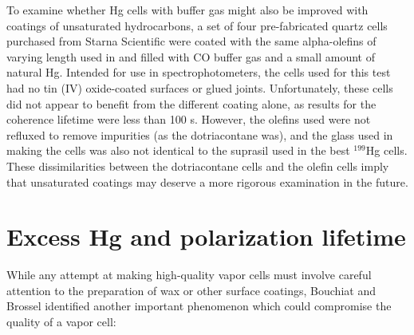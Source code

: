 \documentclass [10pt, twoside] {uwthesis}[2012/04/02]
\begin{document}
To examine whether Hg cells with buffer gas might also be improved with coatings of unsaturated hydrocarbons, a set of four pre-fabricated quartz cells purchased from Starna Scientific were coated with the same alpha-olefins of varying length used in \cite{2010_Budker_long_Rb_coherence_alpha_olefins} and filled with CO buffer gas and a small amount of natural Hg. Intended for use in spectrophotometers, the cells used for this test had no tin (IV) oxide-coated surfaces or glued joints. Unfortunately, these cells did not appear to benefit from the different coating alone, as results for the coherence lifetime were less than 100 s. However, the olefins used were not refluxed to remove impurities (as the dotriacontane was), and the glass used in making the cells was also not identical to the suprasil used in the best $^{199}$Hg cells. These dissimilarities between the dotriacontane cells and the olefin cells imply that unsaturated coatings may deserve a more rigorous examination in the future.

\section{Excess Hg and polarization lifetime}
While any attempt at making high-quality vapor cells must involve careful attention to the preparation of wax or other surface coatings, Bouchiat and Brossel \cite{1966_Bouchiat_Brossel_Rb_relaxation} identified another important phenomenon which could compromise the quality of a vapor cell:
\end{document}
